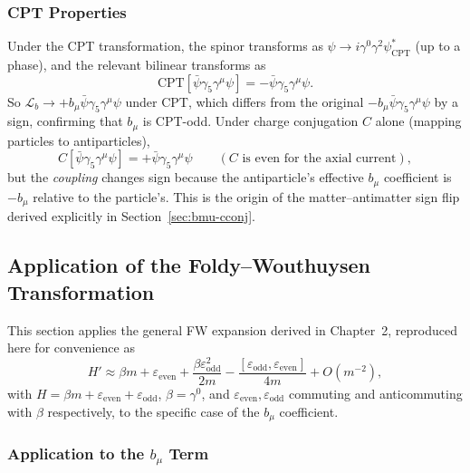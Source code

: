 \documentclass[main]{subfiles}
\begin{document}
\subsubsection{CPT Properties}

Under the CPT transformation, the spinor transforms as
$\psi\to i\gamma^0\gamma^2\psi^*_{\text{CPT}}$ (up to a phase), and the
relevant bilinear transforms as
\begin{equation}
  \mathrm{CPT}\!\left[\bar\psi\gamma_5\gamma^\mu\psi\right]
  = -\bar\psi\gamma_5\gamma^\mu\psi.
\end{equation}
So $\mathcal L_b\to+b_\mu\bar\psi\gamma_5\gamma^\mu\psi$ under CPT, which
differs from the original $-b_\mu\bar\psi\gamma_5\gamma^\mu\psi$ by a sign,
confirming that $b_\mu$ is CPT-odd. Under charge conjugation $C$ alone
(mapping particles to antiparticles),
\begin{equation}
  C\!\left[\bar\psi\gamma_5\gamma^\mu\psi\right]
  = +\bar\psi\gamma_5\gamma^\mu\psi
  \qquad (C\text{ is even for the axial current}),
\end{equation}
but the \emph{coupling} changes sign because the antiparticle's effective
$b_\mu$ coefficient is $-b_\mu$ relative to the particle's. This is the
origin of the matter--antimatter sign flip derived explicitly in
Section~\ref{sec:bmu-cconj}.

\subsection{Application of the Foldy--Wouthuysen Transformation}

This section applies the general FW expansion derived in Chapter~2,
reproduced here for convenience as
\begin{equation}
  H' \approx \beta m + \varepsilon_{\text{even}}
  + \frac{\beta\varepsilon_{\text{odd}}^2}{2m}
  - \frac{[\varepsilon_{\text{odd}},\varepsilon_{\text{even}}]}{4m}
  + O(m^{-2}), \label{eq:FWexpansion}
\end{equation}
with $H=\beta m+\varepsilon_{\text{even}}+\varepsilon_{\text{odd}}$,
$\beta=\gamma^0$, and $\varepsilon_{\text{even}},\varepsilon_{\text{odd}}$
commuting and anticommuting with $\beta$ respectively, to the specific
case of the $b_\mu$ coefficient.

\subsubsection{Application to the \texorpdfstring{$b_\mu$}{b\_mu} Term}
\label{sec:bmu-application}
\end{document}
